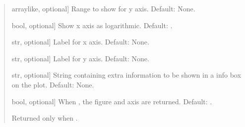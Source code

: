 \documentclass[letterpaper,10pt,english]{sphinxmanual}
\begin{document}
\begin{fulllineitems}
\begin{quote}
\begin{description}
\begin{description}
\sphinxlineitem{\sphinxstylestrong{range\_y}}{[}array\sphinxhyphen{}like, optional{]}
\sphinxAtStartPar
Range to show for y axis. Default: None.

\sphinxlineitem{\sphinxstylestrong{log}}{[}bool, optional{]}
\sphinxAtStartPar
Show x axis as logarithmic. Default: .

\sphinxlineitem{\sphinxstylestrong{xlabel}}{[}str, optional{]}
\sphinxAtStartPar
Label for x axis. Default: None.

\sphinxlineitem{\sphinxstylestrong{ylabel}}{[}str, optional{]}
\sphinxAtStartPar
Label for y axis. Default: None.

\sphinxlineitem{\sphinxstylestrong{info\_box}}{[}str, optional{]}
\sphinxAtStartPar
String containing extra information to be shown in a info box on the
plot. Default: None.

\sphinxlineitem{\sphinxstylestrong{returns}}{[}bool, optional{]}
\sphinxAtStartPar
When , the figure and axis are returned. Default: .

\end{description}

\begin{description}
\sphinxAtStartPar
Returned only when .

\end{description}

\end{description}\end{quote}

\end{fulllineitems}

\end{document}
